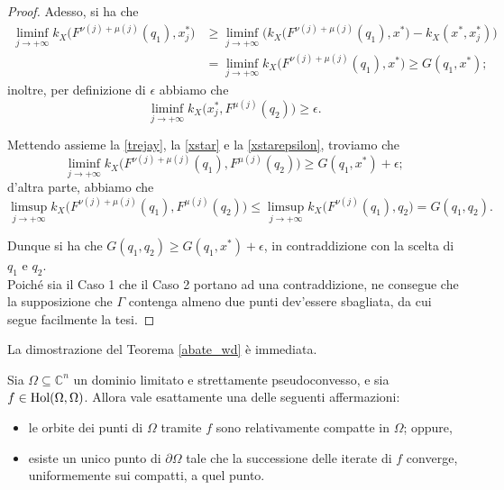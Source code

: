 \begin{proof}
    Adesso, si ha che
    \begin{equation} \label{xstar}
        \begin{aligned}
            \liminf_{j\longrightarrow+\infty}k_X\big(F^{\nu(j)+\mu(j)}(q_1),x_j^*\big) &\ge \liminf_{j\longrightarrow+\infty} \Big(k_X\big(F^{\nu(j)+\mu(j)}(q_1),x^*\big)-k_X(x^*,x_j^*)\Big)\\
            &=\liminf_{j\longrightarrow+\infty}k_X\big(F^{\nu(j)+\mu(j)}(q_1),x^*\big) \ge G(q_1,x^*);
        \end{aligned}
    \end{equation}
    inoltre, per definizione di $\epsilon$ abbiamo che
    \begin{equation} \label{xstarepsilon}
        \liminf_{j\longrightarrow+\infty}k_X\big(x_j^*,F^{\mu(j)}(q_2)\big) \ge \epsilon.
    \end{equation}

    Mettendo assieme la \eqref{trejay}, la \eqref{xstar} e la \eqref{xstarepsilon}, troviamo che
    $$\liminf_{j\longrightarrow+\infty}k_X\big(F^{\nu(j)+\mu(j)}(q_1),F^{\mu(j)}(q_2)\big) \ge G(q_1,x^*)+\epsilon;$$
    d'altra parte, abbiamo che
    $$\limsup_{j\longrightarrow+\infty}k_X\big(F^{\nu(j)+\mu(j)}(q_1),F^{\mu(j)}(q_2)\big) \le \limsup_{j\longrightarrow+\infty}k_X\big(F^{\nu(j)}(q_1),q_2\big)=G(q_1,q_2).$$

    Dunque si ha che $G(q_1,q_2) \ge G(q_1,x^*)+\epsilon$, in contraddizione con la scelta di $q_1$ e $q_2$. \\

    Poiché sia il Caso 1 che il Caso 2 portano ad una contraddizione, ne consegue che la supposizione che $\Gamma$ contenga almeno due punti dev'essere sbagliata, da cui segue facilmente la tesi.
\end{proof}

La dimostrazione del Teorema \ref{abate_wd} è immediata.

\begin{cor}
    Sia $\Omega \subseteq \mathbb{C}^n$ un dominio limitato e strettamente pseudoconvesso, e sia $f \in \textnormal{Hol}(\Omega,\Omega)$. Allora vale esattamente una delle seguenti affermazioni:
    \begin{itemize}
        \item le orbite dei punti di $\Omega$ tramite $f$ sono relativamente compatte in $\Omega$; oppure,
        \item esiste un unico punto di $\partial\Omega$ tale che la successione delle iterate di $f$ converge, uniformemente sui compatti, a quel punto.
    \end{itemize}
\end{cor}

